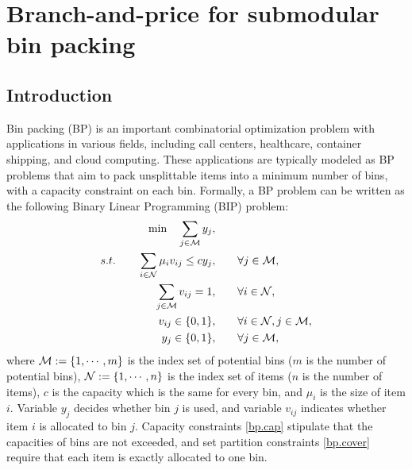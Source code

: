 \chapter{Branch-and-price for submodular bin packing}
\label{chap.sbp}



\section{Introduction}

Bin packing (BP) is an important combinatorial optimization problem with applications in various fields, including call centers, healthcare, container shipping, and cloud computing. These applications are typically modeled as BP problems that aim to pack unsplittable items into a minimum number of bins, with a capacity constraint on each bin.  Formally, a BP problem can be written as the following Binary Linear Programming (BIP) problem:
 \begin{subequations}
 \label{bp}
 \begin{align}
 \min \quad \sum_{j \in \mathcal M} {y}_{{j}}, \qquad&\\
 s.t. \qquad \sum_{i \in \mathcal N} \mu_i v_{ij} \le c {y}_{{j}}, \qquad& \forall j \in \mathcal M, \label{bp.cap} \\
  \sum_{j \in \mathcal M} v_{ij} = 1, \qquad& \forall i \in \mathcal N, \label{bp.cover} \\
  v_{ij} \in \{0,1\}, \qquad& \forall i \in \mathcal N, j \in \mathcal M, \label{bp.x}\\
  y_{j} \in \{0,1\}, \qquad& \forall j \in \mathcal M \label{bp.y},
 \end{align}
 \end{subequations}
where  $\mathcal M:=\{1,\cdots,m\}$ is the index set of potential bins ($m$ is the number of potential bins), $\mathcal N:=\{1,\cdots, n\}$ is the index set of items ($n$ is the number of items),  $c$ is the capacity which is the same for every bin, and $\mu_i$ is the size of item $i$.  Variable $y_j$ decides whether bin $j$ is used, and variable $v_{ij}$ indicates whether item $i$ is allocated to bin $j$.  Capacity constraints \eqref{bp.cap} stipulate that the capacities of bins are not exceeded, and set partition constraints \eqref{bp.cover} require that each item is exactly allocated to one bin.


